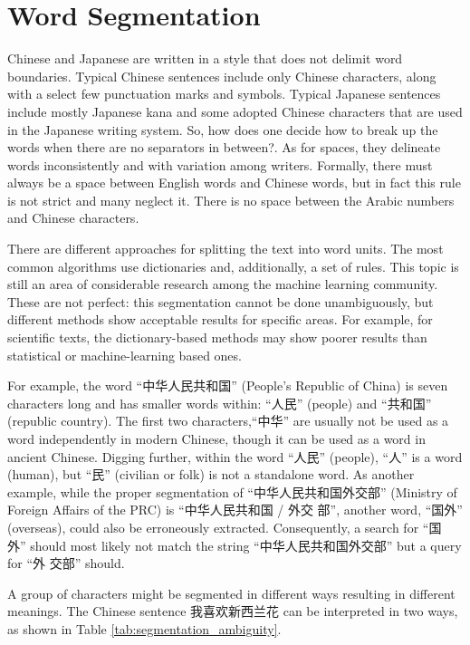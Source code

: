 \documentclass[11pt]{article}
\begin{document}
\section{Word Segmentation}
Chinese and Japanese are written in a style that does not delimit word boundaries. Typical Chinese sentences include only Chinese characters, along with a select few punctuation marks and symbols. Typical Japanese sentences include mostly Japanese kana and some adopted Chinese characters that are used in the Japanese writing system. So, how does one decide how to break up the words when there are no separators in between?. As for spaces, they delineate words inconsistently and with variation among writers. Formally, there must always be a space between English words and Chinese words, but in fact this rule is not strict and many neglect it. There is no space between the Arabic numbers and Chinese characters.

There are different approaches for splitting the text into word units. The most common algorithms use dictionaries and, additionally, a set of rules. This topic is still an area of considerable research among the machine learning community. These are not perfect: this segmentation cannot be done unambiguously, but different methods show acceptable results for specific areas. For example, for scientific texts, the dictionary-based methods may show poorer results than statistical or machine-learning based ones.

For example, the word “中华人民共和国” (People’s Republic of China) is seven characters long and has smaller words within: “人民” (people) and “共和国” (republic country). The first two characters,“中华” are usually not be used as a word independently in modern Chinese, though it can be used as a word in ancient Chinese. Digging further, within the word “人民” (people), “人” is a word (human), but “民” (civilian or folk) is not a standalone word. As another example, while the proper segmentation of “中华人民共和国外交部” (Ministry of Foreign Affairs of the PRC) is “中华人民共和国 / 外交 部”, another word, “国外” (overseas), could also be erroneously extracted. Consequently, a search for “国 外” should most likely not match the string “中华人民共和国外交部” but a query for “外 交部” should.

A group of characters might be segmented in different ways resulting in different meanings. The Chinese sentence 我喜欢新西兰花 can be interpreted in two ways, as shown in Table \ref{tab:segmentation_ambiguity}.
\end{document}
